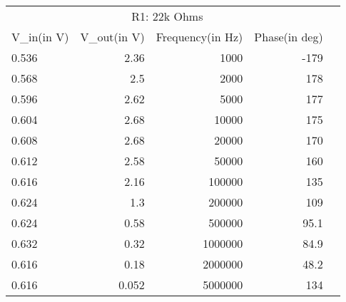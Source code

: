 \begin{table}[!htp]\centering
    \scriptsize
    \begin{tabular}{lrrrr}\toprule
        \multicolumn{4}{c}{R1: 22k Ohms}                              \\\cmidrule{1-4}
        V\_in(in V) & V\_out(in V) & Frequency(in Hz) & Phase(in deg) \\\midrule
        0.536       & 2.36         & 1000             & -179          \\
        0.568       & 2.5          & 2000             & 178           \\
        0.596       & 2.62         & 5000             & 177           \\
        0.604       & 2.68         & 10000            & 175           \\
        0.608       & 2.68         & 20000            & 170           \\
        0.612       & 2.58         & 50000            & 160           \\
        0.616       & 2.16         & 100000           & 135           \\
        0.624       & 1.3          & 200000           & 109           \\
        0.624       & 0.58         & 500000           & 95.1          \\
        0.632       & 0.32         & 1000000          & 84.9          \\
        0.616       & 0.18         & 2000000          & 48.2          \\
        0.616       & 0.052        & 5000000          & 134           \\
        \bottomrule
    \end{tabular}
\end{table}


